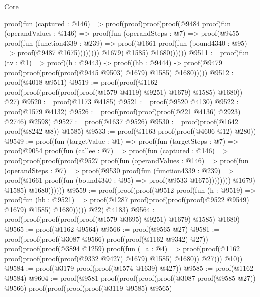 \begin{lexlean}{Core}
\begin{coremodule}
            proof(fun (captured : @146) =>
              proof(proof(proof(proof(@9484
                        proof(fun (operandValues : @146) =>
                          proof(fun (operandSteps : @7) =>
                            proof(@9455
                                proof(fun (function4339 : @239) =>
                                  proof(@1661
                                      proof(fun (bound4340 : @95) => proof(@9487 @1675))))))))
                      @1679)
                    @1585)
                  @1680))))))
@9511 := proof(fun (tv : @1) =>
    proof((h : @9443) ->
      proof((hb : @9444) ->
        proof(@9479 proof(proof(proof(proof(@9445 @9503) @1679) @1585) @1680)))))
@9512 := proof(@4018 @9511)
@9519 := proof(proof(@1162 proof(proof(proof(proof(proof(@1579 @4119) @9251) @1679) @1585) @1680))
      @27)
@9520 := proof(@1173 @4185)
@9521 := proof(@9520 @4130)
@9522 := proof(@1579 @4132)
@9526 := proof(proof(proof(proof(@221 @4136) @2923) @2746) @2598)
@9527 := proof(@1637 @9526)
@9530 := proof(proof(@1642 proof(@8242 @8)) @1585)
@9533 := proof(@1163 proof(proof(@4606 @12) @280))
@9549 := proof(fun (targetValue : @1) =>
    proof(fun (targetSteps : @7) =>
      proof(@9054
          proof(fun (callee : @7) =>
            proof(fun (captured : @146) =>
              proof(proof(proof(proof(@9527
                        proof(fun (operandValues : @146) =>
                          proof(fun (operandSteps : @7) =>
                            proof(@9530
                                proof(fun (function4339 : @239) =>
                                  proof(@1661
                                      proof(fun (bound4340 : @95) => proof(@9533 @1675))))))))
                      @1679)
                    @1585)
                  @1680))))))
@9559 := proof(proof(proof(@9512
          proof(fun (h : @9519) =>
            proof(fun (hb : @9521) =>
              proof(@1287 proof(proof(proof(proof(@9522 @9549) @1679) @1585) @1680)))))
        @22)
      @4183)
@9564 := proof(proof(proof(proof(proof(@1579 @3695) @9251) @1679) @1585) @1680)
@9565 := proof(@1162 @9564)
@9566 := proof(@9565 @27)
@9581 := proof(proof(proof(@3087 @9566) proof(proof(@1162 @9342) @27))
      proof(proof(proof(@3894 @1259)
            proof(fun (_a : @4) =>
              proof(proof(@1162 proof(proof(proof(proof(@9332 @9427) @1679) @1585) @1680)) @27)))
          @10))
@9584 := proof(@3179 proof(proof(@1574 @1639) @427))
@9585 := proof(@1162 @9584)
@9604 := proof(@9581
      proof(proof(proof(proof(@3087 proof(@9585 @27)) @9566)
            proof(proof(proof(proof(@3119 @9585) @9565)

\end{coremodule}
\end{lexlean}
